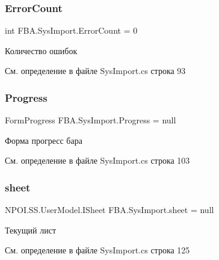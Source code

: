 \subsubsection{\texorpdfstring{Error\+Count}{ErrorCount}}
{\footnotesize\ttfamily int F\+B\+A.\+Sys\+Import.\+Error\+Count = 0}



Количество ошибок 



См. определение в файле Sys\+Import.\+cs строка 93

\mbox{\label{class_f_b_a_1_1_sys_import_aaa3b004295e0192bcd2e7abbb9ced53b}} 
\subsubsection{\texorpdfstring{Progress}{Progress}}
{\footnotesize\ttfamily Form\+Progress F\+B\+A.\+Sys\+Import.\+Progress = null}



Форма прогресс бара 



См. определение в файле Sys\+Import.\+cs строка 103

\mbox{\label{class_f_b_a_1_1_sys_import_ace1ed279d01ad9253158209f464187fa}} 
\subsubsection{\texorpdfstring{sheet}{sheet}}
{\footnotesize\ttfamily N\+P\+O\+I.\+S\+S.\+User\+Model.\+I\+Sheet F\+B\+A.\+Sys\+Import.\+sheet = null}



Текущий лист 



См. определение в файле Sys\+Import.\+cs строка 125

\mbox{\label{class_f_b_a_1_1_sys_import_a0b4d685dafe5ad7443294ff6b1ff2ed7}} 
